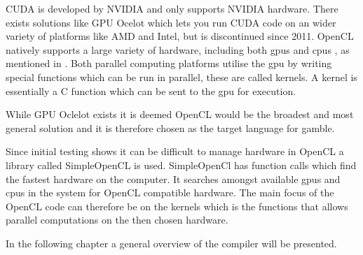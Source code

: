 CUDA is developed by NVIDIA and only supports NVIDIA hardware.
There exists solutions like GPU Ocelot which lets you run CUDA code on an wider variety of platforms like AMD and Intel, but is discontinued since 2011. \citep{Diamos:2010:ODO:1854273.1854318}
OpenCL natively supports a large variety of hardware, including both \acrshort{gpu}s and \acrshort{cpu}s , as mentioned in .
Both parallel computing platforms utilise the \acrshort{gpu} by writing special functions which can be run in parallel, these are called kernels.
A kernel is essentially a C function which can be sent to the \acrshort{gpu} for execution.

While GPU Oclelot exists it is deemed OpenCL would be the broadest and most general solution and it is therefore chosen as the target language for \gls{gamble}.

Since initial testing shows it can be difficult to manage hardware in OpenCL a library called SimpleOpenCL is used.
SimpleOpenCl has function calls which find the fastest hardware on the computer.
It searches amongst available \acrshort{gpu}s and \acrshort{cpu}s in the system for OpenCL compatible hardware. \citep{simpleCL}
The main focus of the OpenCL code can therefore be on the kernels which is the functions that allows parallel computations on the then chosen hardware.

In the following chapter a general overview of the compiler will be presented.
